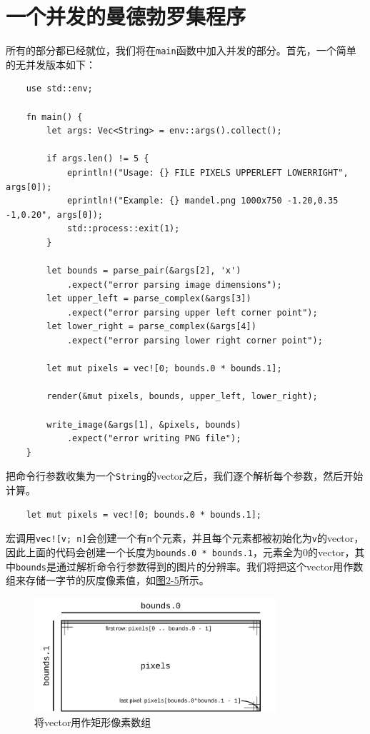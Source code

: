 \section{一个并发的曼德勃罗集程序}
所有的部分都已经就位，我们将在\texttt{main}函数中加入并发的部分。首先，一个简单的无并发版本如下：
\begin{verbatim}
    use std::env;

    fn main() {
        let args: Vec<String> = env::args().collect();

        if args.len() != 5 {
            eprintln!("Usage: {} FILE PIXELS UPPERLEFT LOWERRIGHT",     args[0]);
            eprintln!("Example: {} mandel.png 1000x750 -1.20,0.35   -1,0.20", args[0]);
            std::process::exit(1);
        }

        let bounds = parse_pair(&args[2], 'x')
            .expect("error parsing image dimensions");
        let upper_left = parse_complex(&args[3])
            .expect("error parsing upper left corner point");
        let lower_right = parse_complex(&args[4])
            .expect("error parsing lower right corner point");

        let mut pixels = vec![0; bounds.0 * bounds.1];

        render(&mut pixels, bounds, upper_left, lower_right);

        write_image(&args[1], &pixels, bounds)
            .expect("error writing PNG file");
    }
\end{verbatim}

把命令行参数收集为一个\texttt{String}的vector之后，我们逐个解析每个参数，然后开始计算。

\begin{verbatim}
    let mut pixels = vec![0; bounds.0 * bounds.1];
\end{verbatim}

宏调用\texttt{vec![v; n]}会创建一个有\texttt{n}个元素，并且每个元素都被初始化为\texttt{v}的vector，因此上面的代码会创建一个长度为\texttt{bounds.0 * bounds.1}，元素全为0的vector，其中\texttt{bounds}是通过解析命令行参数得到的图片的分辨率。我们将把这个vector用作数组来存储一字节的灰度像素值，如\hyperref[f2-5]{图2-5}所示。

\begin{figure}[htbp]
    \centering
    \includegraphics[width=0.8\textwidth]{../img/f2-5.png}
    \caption{将vector用作矩形像素数组}
    \label{f2-5}
\end{figure}

